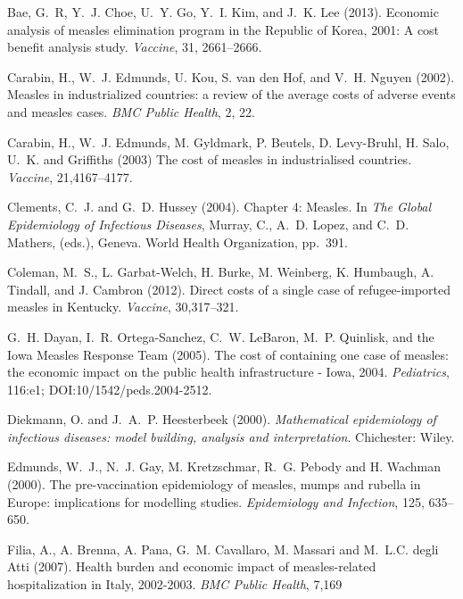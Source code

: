 \documentclass{article}
\begin{document}
{\begin{thebibliography}{}
Bae, G.~R, Y.~J. Choe, U.~Y. Go, Y.~I. Kim, and J.~K. Lee (2013). 
\newblock Economic analysis of measles elimination program in the Republic of Korea, 2001: A cost benefit analysis study.
\newblock \emph {Vaccine}, 31, 2661--2666.

Carabin, H., W.~J. Edmunds, U. Kou, S. van den Hof, and V.~H. Nguyen (2002). 
\newblock Measles in industrialized countries: a review of the average costs of adverse events and measles cases.
\newblock \emph{BMC Public Health}, 2, 22.

Carabin, H., W.~J. Edmunds, M. Gyldmark, P. Beutels, D. Levy-Bruhl, H. Salo, U.~K. and Griffiths (2003)
\newblock The cost of measles in industrialised countries.
\newblock \emph{Vaccine}, 21,4167--4177.

Clements, C.~J. and G.~D. Hussey (2004).
\newblock Chapter 4: Measles.
\newblock In \emph{The Global Epidemiology of Infectious Diseases},  Murray, C., A.~D. Lopez, and C.~D. Mathers, (eds.), Geneva.
  World Health Organization, pp.~391.

Coleman, M.~S., L. Garbat-Welch, H. Burke, M. Weinberg, K. Humbaugh, A. Tindall, and J. Cambron (2012).
\newblock Direct costs of a single case of refugee-imported measles in Kentucky.
\newblock \emph{Vaccine}, 30,317--321.

G.~H. Dayan, I.~R. Ortega-Sanchez, C.~W. LeBaron, M.~P. Quinlisk, and the Iowa Measles Response Team (2005).
\newblock The cost of containing one case of measles: the economic impact on the public health infrastructure - Iowa, 2004.
\newblock \emph{Pediatrics}, 116:e1; DOI:10/1542/peds.2004-2512.

Diekmann, O. and  J.~A.~P. Heesterbeek (2000).
\newblock \emph{Mathematical epidemiology of infectious diseases: model building, analysis and interpretation}.
Chichester: Wiley.

Edmunds, W.~J., N.~J. Gay, M. Kretzschmar, R.~G. Pebody and H. Wachman (2000).
\newblock The pre-vaccination epidemiology of measles, mumps and rubella in Europe: implications for modelling studies.
\newblock \emph{Epidemiology and Infection}, 125, 635--650.

Filia, A., A. Brenna, A. Pana, G.~M. Cavallaro, M. Massari and M.~L.C. degli Atti (2007).
\newblock Health burden and economic impact of measles-related hospitalization in Italy, 2002-2003.
\newblock \emph{BMC Public Health}, 7,169


\end{thebibliography}}
\end{document}
